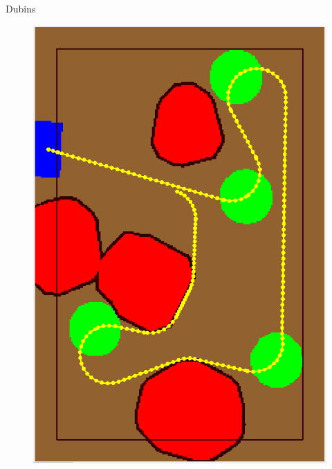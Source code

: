 \begin{frame}[fragile]{Dubins}
\begin{figure}[H]
	\begin{minipage}{0.45\linewidth}
		\includegraphics[scale=0.19]{Immagini/map4}
	\end{minipage}
	\vspace{0.10\linewidth}
	\begin{minipage}{0.45\linewidth}

\end{minipage}
\end{figure}
\end{frame}
